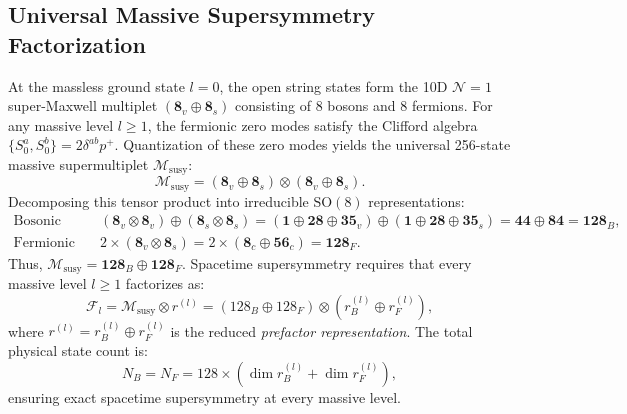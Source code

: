 \documentclass[11pt,a4paper]{article}
\begin{document}
\subsection{Universal Massive Supersymmetry Factorization}
At the massless ground state $l=0$, the open string states form the 10D $\mathcal{N}=1$ super-Maxwell multiplet $(\mathbf{8}_v \oplus \mathbf{8}_s)$ consisting of 8 bosons and 8 fermions.
For any massive level $l \ge 1$, the fermionic zero modes satisfy the Clifford algebra $\{S_0^a, S_0^b\} = 2 \delta^{ab} p^+$. Quantization of these zero modes yields the universal 256-state massive supermultiplet $\mathcal{M}_{\text{susy}}$:
\begin{equation}
    \mathcal{M}_{\text{susy}} = (\mathbf{8}_v \oplus \mathbf{8}_s) \otimes (\mathbf{8}_v \oplus \mathbf{8}_s).
\end{equation}
Decomposing this tensor product into irreducible $\mathrm{SO}(8)$ representations:
\begin{align}
    \text{Bosonic sector:}\quad & (\mathbf{8}_v \otimes \mathbf{8}_v) \oplus (\mathbf{8}_s \otimes \mathbf{8}_s) = (\mathbf{1} \oplus \mathbf{28} \oplus \mathbf{35}_v) \oplus (\mathbf{1} \oplus \mathbf{28} \oplus \mathbf{35}_s) = \mathbf{44} \oplus \mathbf{84} = \mathbf{128}_B, \\
    \text{Fermionic sector:}\quad & 2 \times (\mathbf{8}_v \otimes \mathbf{8}_s) = 2 \times (\mathbf{8}_c \oplus \mathbf{56}_c) = \mathbf{128}_F.
\end{align}
Thus, $\mathcal{M}_{\text{susy}} = \mathbf{128}_B \oplus \mathbf{128}_F$. Spacetime supersymmetry requires that every massive level $l \ge 1$ factorizes as:
\begin{equation}
    \mathcal{F}_l = \mathcal{M}_{\text{susy}} \otimes r^{(l)} = (128_B \oplus 128_F) \otimes (r_B^{(l)} \oplus r_F^{(l)}),
    \label{eq:susy_factorization}
\end{equation}
where $r^{(l)} = r_B^{(l)} \oplus r_F^{(l)}$ is the reduced \emph{prefactor representation}. The total physical state count is:
\begin{equation}
    N_B = N_F = 128 \times \left(\dim r_B^{(l)} + \dim r_F^{(l)}\right),
\end{equation}
ensuring exact spacetime supersymmetry at every massive level.
\end{document}
